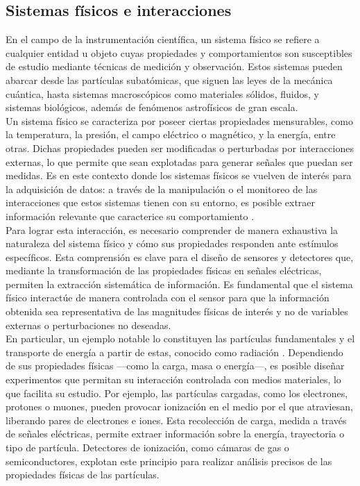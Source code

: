 \documentclass{report}
\begin{document}
\subsection{Sistemas físicos e interacciones}

\noindent En el campo de la instrumentación científica, un sistema físico se refiere a cualquier entidad u objeto cuyas propiedades y comportamientos son susceptibles de estudio mediante técnicas de medición y observación. Estos sistemas pueden abarcar desde las partículas subatómicas, que siguen las leyes de la mecánica cuántica, hasta sistemas macroscópicos como materiales sólidos, fluidos, y sistemas biológicos, además de fenómenos astrofísicos de gran escala.\\

\noindent Un sistema físico se caracteriza por poseer ciertas propiedades mensurables, como la temperatura, la presión, el campo eléctrico o magnético, y la energía, entre otras. Dichas propiedades pueden ser modificadas o perturbadas por interacciones externas, lo que permite que sean explotadas para generar señales que puedan ser medidas. Es en este contexto donde los sistemas físicos se vuelven de interés para la adquisición de datos: a través de la manipulación o el monitoreo de las interacciones que estos sistemas tienen con su entorno, es posible extraer información relevante que caracterice su comportamiento \cite{o1785essay}.\\

\noindent Para lograr esta interacción, es necesario comprender de manera exhaustiva la naturaleza del sistema físico y cómo sus propiedades responden ante estímulos específicos. Esta comprensión es clave para el diseño de sensores y detectores que, mediante la transformación de las propiedades físicas en señales eléctricas, permiten la extracción sistemática de información. Es fundamental que el sistema físico interactúe de manera controlada con el sensor para que la información obtenida sea representativa de las magnitudes físicas de interés y no de variables externas o perturbaciones no deseadas.\\

\noindent En particular, un ejemplo notable lo constituyen las partículas fundamentales y el transporte de energía a partir de estas, conocido como radiación \cite{knoll1}. Dependiendo de sus propiedades físicas —como la carga, masa o energía—, es posible diseñar experimentos que permitan su interacción controlada con medios materiales, lo que facilita su estudio. Por ejemplo, las partículas cargadas, como los electrones, protones o muones, pueden provocar ionización en el medio por el que atraviesan, liberando pares de electrones e iones. Esta recolección de carga, medida a través de señales eléctricas, permite extraer información sobre la energía, trayectoria o tipo de partícula. Detectores de ionización, como cámaras de gas o semiconductores, explotan este principio para realizar análisis precisos de las propiedades físicas de las partículas.\\
\end{document}

